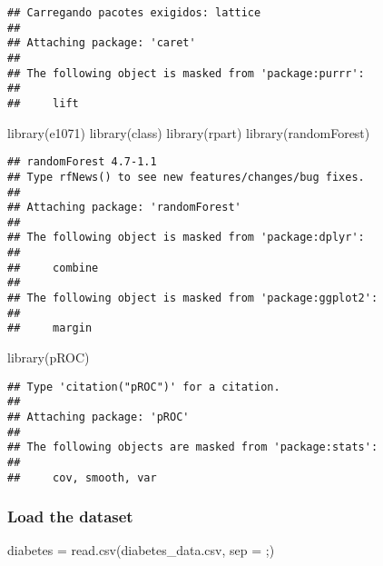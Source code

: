 \documentclass[
]{article}
\newenvironment{Shaded}{\begin{snugshade}}{\end{snugshade}}
\newcommand{\AttributeTok}[1]{\textcolor[rgb]{0.77,0.63,0.00}{#1}}
\newcommand{\FunctionTok}[1]{\textcolor[rgb]{0.00,0.00,0.00}{#1}}
\newcommand{\NormalTok}[1]{#1}
\newcommand{\OtherTok}[1]{\textcolor[rgb]{0.56,0.35,0.01}{#1}}
\newcommand{\StringTok}[1]{\textcolor[rgb]{0.31,0.60,0.02}{#1}}
\begin{document}
\begin{verbatim}
## Carregando pacotes exigidos: lattice
## 
## Attaching package: 'caret'
## 
## The following object is masked from 'package:purrr':
## 
##     lift
\end{verbatim}

\begin{Shaded}
\begin{Highlighting}[]
\FunctionTok{library}\NormalTok{(e1071)}
\FunctionTok{library}\NormalTok{(class)}
\FunctionTok{library}\NormalTok{(rpart)}
\FunctionTok{library}\NormalTok{(randomForest)}
\end{Highlighting}
\end{Shaded}

\begin{verbatim}
## randomForest 4.7-1.1
## Type rfNews() to see new features/changes/bug fixes.
## 
## Attaching package: 'randomForest'
## 
## The following object is masked from 'package:dplyr':
## 
##     combine
## 
## The following object is masked from 'package:ggplot2':
## 
##     margin
\end{verbatim}

\begin{Shaded}
\begin{Highlighting}[]
\FunctionTok{library}\NormalTok{(pROC)}
\end{Highlighting}
\end{Shaded}

\begin{verbatim}
## Type 'citation("pROC")' for a citation.
## 
## Attaching package: 'pROC'
## 
## The following objects are masked from 'package:stats':
## 
##     cov, smooth, var
\end{verbatim}

\hypertarget{load-the-dataset}{%
\subsubsection{Load the dataset}\label{load-the-dataset}}

\begin{Shaded}
\begin{Highlighting}[]
\NormalTok{diabetes }\OtherTok{=} \FunctionTok{read.csv}\NormalTok{(}\StringTok{\textquotesingle{}diabetes\_data.csv\textquotesingle{}}\NormalTok{, }\AttributeTok{sep =} \StringTok{\textquotesingle{};\textquotesingle{}}\NormalTok{)}
\end{Highlighting}
\end{Shaded}
\end{document}
